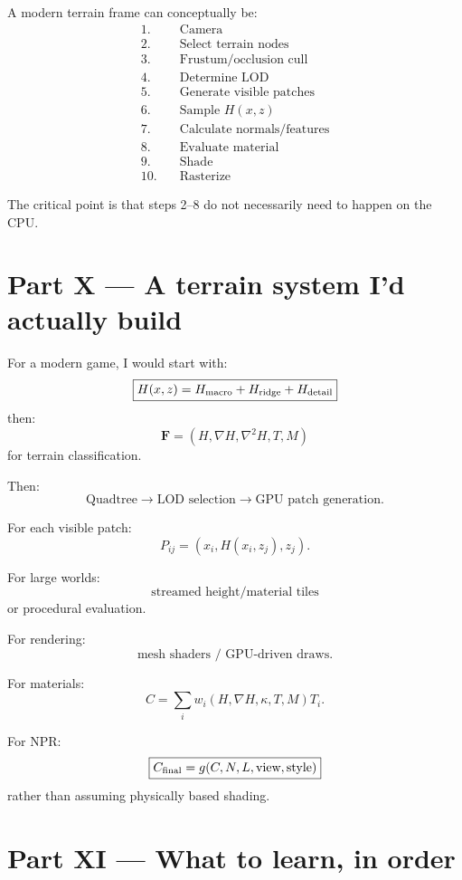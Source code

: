 \documentclass[12pt]{article}
\begin{document}
	A modern terrain frame can conceptually be:
	\[
	\boxed{
		\begin{aligned}
			1.&\quad \text{Camera}\\
			2.&\quad \text{Select terrain nodes}\\
			3.&\quad \text{Frustum/occlusion cull}\\
			4.&\quad \text{Determine LOD}\\
			5.&\quad \text{Generate visible patches}\\
			6.&\quad \text{Sample }H(x,z)\\
			7.&\quad \text{Calculate normals/features}\\
			8.&\quad \text{Evaluate material}\\
			9.&\quad \text{Shade}\\
			10.&\quad \text{Rasterize}
		\end{aligned}
	}
	\]
	
	The critical point is that steps 2--8 do not necessarily need to happen on the CPU.
	
	\section*{Part X — A terrain system I'd actually build}
	
	For a modern game, I would start with:
	\[
	\boxed{
		H(x,z)= H_{\rm macro} + H_{\rm ridge} + H_{\rm detail}
	}
	\]
	then:
	\[
	\boxed{
		\mathbf F= (H,\nabla H,\nabla^2H,T,M)
	}
	\]
	for terrain classification.
	
	Then:
	\[
	\boxed{
		\text{Quadtree} \rightarrow \text{LOD selection} \rightarrow \text{GPU patch generation}.
	}
	\]
	
	For each visible patch:
	\[
	P_{ij}= (x_i,H(x_i,z_j),z_j).
	\]
	
	For large worlds:
	\[
	\boxed{
		\text{streamed height/material tiles}
	}
	\]
	or procedural evaluation.
	
	For rendering:
	\[
	\boxed{
		\text{mesh shaders / GPU-driven draws}.
	}
	\]
	
	For materials:
	\[
	\boxed{
		C= \sum_i w_i(H,\nabla H,\kappa,T,M) T_i.
	}
	\]
	
	For NPR:
	\[
	\boxed{
		C_{\rm final}= g(C,N,L,\text{view},\text{style})
	}
	\]
	rather than assuming physically based shading.
	
	\section*{Part XI — What to learn, in order}
	
\end{document}
